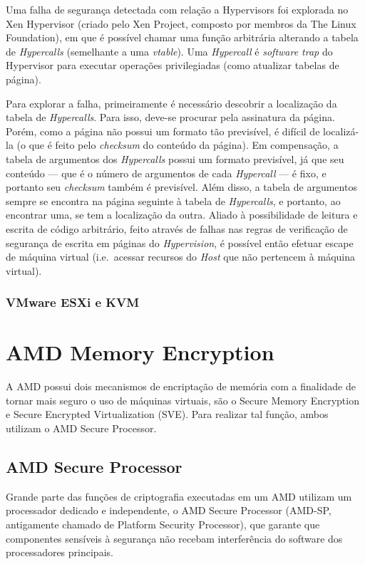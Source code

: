 \documentclass{report}
\begin{document}
Uma falha de segurança detectada com relação a Hypervisors foi explorada no Xen
Hypervisor (criado pelo Xen Project, composto por membros da The Linux
Foundation), em que é possível chamar uma função arbitrária alterando a tabela
de \textit{Hypercalls} (semelhante a uma \textit{vtable}). Uma
\textit{Hypercall} é \textit{software trap} do Hypervisor para executar
operações privilegiadas (como atualizar tabelas de página).

Para explorar a falha, primeiramente é necessário descobrir a localização da
tabela de \textit{Hypercalls}. Para isso, deve-se procurar pela assinatura da
página. Porém, como a página não possui um formato tão previsível, é difícil de
localizá-la (o que é feito pelo \textit{checksum} do conteúdo da página). Em
compensação, a tabela de argumentos dos \textit{Hypercalls} possui um formato
previsível, já que seu conteúdo --- que é o número de argumentos de cada
\textit{Hypercall} --- é fixo, e portanto seu \textit{checksum} também é
previsível. Além disso, a tabela de argumentos sempre se encontra na página
seguinte à tabela de \textit{Hypercalls}, e portanto, ao encontrar uma, se tem
a localização da outra. Aliado à possibilidade de leitura e escrita de código
arbitrário, feito através de falhas nas regras de verificação de segurança de
escrita em páginas do \textit{Hypervision}, é possível então efetuar escape de
máquina virtual (i.e.\ acessar recursos do \textit{Host} que não pertencem à
máquina virtual).

\subsection{VMware ESXi e KVM}

\chapter{AMD Memory Encryption}

A AMD possui dois mecanismos de encriptação de memória com a finalidade de
tornar mais seguro o uso de máquinas virtuais, são o Secure Memory Encryption e
Secure Encrypted Virtualization (SVE). Para realizar tal função, ambos utilizam
o AMD Secure Processor.

\section{AMD Secure Processor}

Grande parte das funções de criptografia executadas em um AMD utilizam um
processador dedicado e independente, o AMD Secure Processor (AMD-SP,
antigamente chamado de Platform Security Processor), que garante que
componentes sensíveis à segurança não recebam interferência do software dos
processadores principais.
\end{document}

